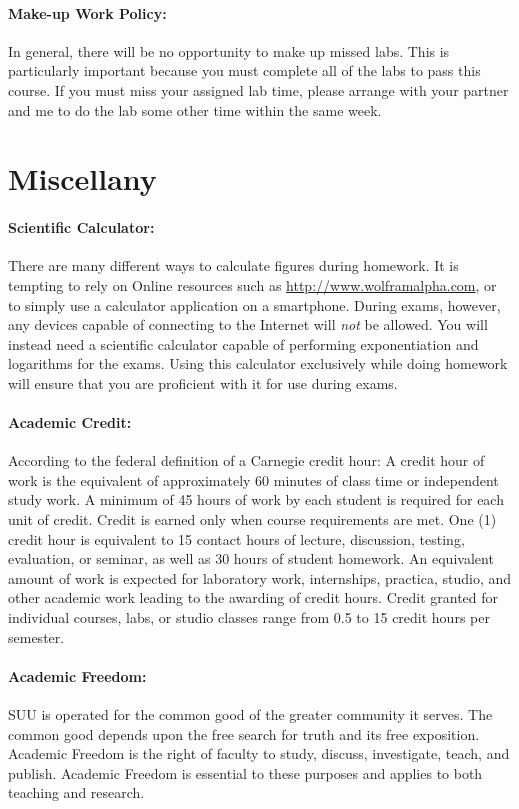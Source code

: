 \documentclass[12pt, letterpaper]{article}
\begin{document}
\paragraph{Make-up Work Policy:}
In general, there will be no opportunity to make up missed labs. This is particularly important because you must complete all of the labs to pass this course. If you must miss your assigned lab time, please arrange with your partner and me to do the lab some other time within the same week.


\section*{Miscellany}

\paragraph{Scientific Calculator:}
There are many different ways to calculate figures during homework. It is tempting to rely on Online resources such as \href{http://www.wolframalpha.com}{http://www.wolframalpha.com}, or to simply use a calculator application on a smartphone. During exams, however, any devices capable of connecting to the Internet will \emph{not} be allowed. You will instead need a scientific calculator capable of performing exponentiation and logarithms for the exams. Using this calculator exclusively while doing homework will ensure that you are proficient with it for use during exams.

\paragraph{Academic Credit:}
According to the federal definition of a Carnegie credit hour: A credit hour of work is the equivalent of approximately 60 minutes of class time or independent study work. A minimum of 45 hours of work by each student is required for each unit of credit. Credit is earned only when course requirements are met. One (1) credit hour is equivalent to 15 contact hours of lecture, discussion, testing, evaluation, or seminar, as well as 30 hours of student homework. An equivalent amount of work is expected for laboratory work, internships, practica, studio, and other academic work leading to the awarding of credit hours. Credit granted for individual courses, labs, or studio classes range from 0.5 to 15 credit hours per semester.

\paragraph{Academic Freedom:}
SUU is operated for the common good of the greater community it serves. The common good depends upon the free search for truth and its free exposition. Academic Freedom is the right of faculty to study, discuss, investigate, teach, and publish. Academic Freedom is essential to these purposes and applies to both teaching and research. 
\end{document}
